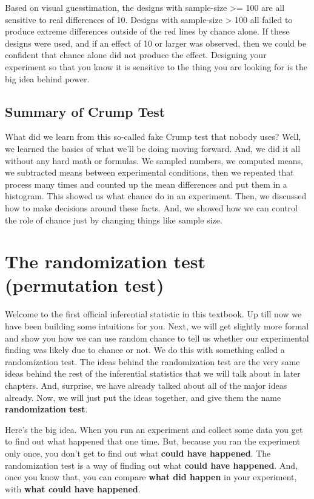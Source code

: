 \documentclass[
  letterpaper,
  DIV=11,
  numbers=noendperiod]{scrreprt}
\begin{document}
Based on visual guesstimation, the designs with sample-size
\textgreater= 100 are all sensitive to real differences of 10. Designs
with sample-size \textgreater{} 100 all failed to produce extreme
differences outside of the red lines by chance alone. If these designs
were used, and if an effect of 10 or larger was observed, then we could
be confident that chance alone did not produce the effect. Designing
your experiment so that you know it is sensitive to the thing you are
looking for is the big idea behind power.

\subsection{Summary of Crump Test}\label{summary-of-crump-test}

What did we learn from this so-called fake Crump test that nobody uses?
Well, we learned the basics of what we'll be doing moving forward. And,
we did it all without any hard math or formulas. We sampled numbers, we
computed means, we subtracted means between experimental conditions,
then we repeated that process many times and counted up the mean
differences and put them in a histogram. This showed us what chance do
in an experiment. Then, we discussed how to make decisions around these
facts. And, we showed how we can control the role of chance just by
changing things like sample size.

\section{The randomization test (permutation
test)}\label{the-randomization-test-permutation-test}

Welcome to the first official inferential statistic in this textbook. Up
till now we have been building some intuitions for you. Next, we will
get slightly more formal and show you how we can use random chance to
tell us whether our experimental finding was likely due to chance or
not. We do this with something called a randomization test. The ideas
behind the randomization test are the very same ideas behind the rest of
the inferential statistics that we will talk about in later chapters.
And, surprise, we have already talked about all of the major ideas
already. Now, we will just put the ideas together, and give them the
name \textbf{randomization test}.

Here's the big idea. When you run an experiment and collect some data
you get to find out what happened that one time. But, because you ran
the experiment only once, you don't get to find out what \textbf{could
have happened}. The randomization test is a way of finding out what
\textbf{could have happened}. And, once you know that, you can compare
\textbf{what did happen} in your experiment, with \textbf{what could
have happened}.
\end{document}
